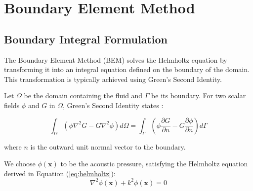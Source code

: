 \section{Boundary Element Method}\label{sec:bem}

\subsection{Boundary Integral Formulation} \label{subsec:bie}

The Boundary Element Method (BEM) solves the Helmholtz equation by transforming it into an integral equation defined on the boundary of the domain. This transformation is typically achieved using Green's Second Identity.




Let $\Omega$ be the domain containing the fluid and $\Gamma$ be its boundary. For two scalar fields $\phi$ and $G$ in $\Omega$, Green's Second Identity states \cite{wu2000boundary}:

\begin{equation}
    \int_{\Omega} \left( \phi \nabla^2 G - G \nabla^2 \phi \right) d\Omega = \int_{\Gamma} \left( \phi \frac{\partial G}{\partial n} - G \frac{\partial \phi}{\partial n} \right) d\Gamma
\end{equation}

where $n$ is the outward unit normal vector to the boundary.

We choose $\phi(\mathbf{x})$ to be the acoustic pressure, satisfying the Helmholtz equation derived in Equation (\ref{eq:helmholtz}):
\begin{equation}
    \nabla^2 \phi(\mathbf{x}) + k^2 \phi(\mathbf{x}) = 0
\end{equation}


